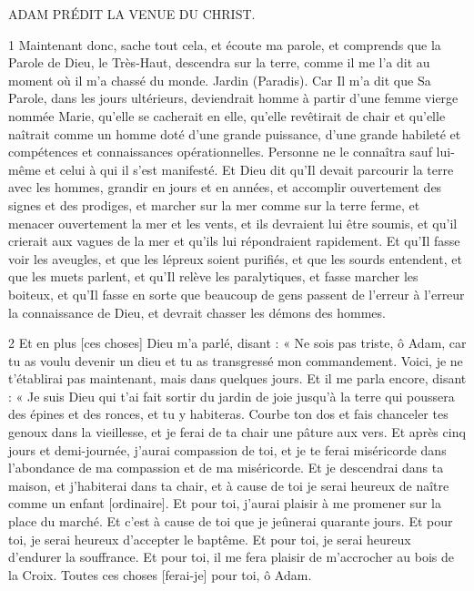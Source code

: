 \par ADAM PRÉDIT LA VENUE DU CHRIST.

\par 1 Maintenant donc, sache tout cela, et écoute ma parole, et comprends que la Parole de Dieu, le Très-Haut, descendra sur la terre, comme il me l'a dit au moment où il m'a chassé du monde. Jardin (Paradis). Car Il m'a dit que Sa Parole, dans les jours ultérieurs, deviendrait homme à partir d'une femme vierge nommée Marie, qu'elle se cacherait en elle, qu'elle revêtirait de chair et qu'elle naîtrait comme un homme doté d'une grande puissance, d'une grande habileté et compétences et connaissances opérationnelles. Personne ne le connaîtra sauf lui-même et celui à qui il s'est manifesté. Et Dieu dit qu'Il devait parcourir la terre avec les hommes, grandir en jours et en années, et accomplir ouvertement des signes et des prodiges, et marcher sur la mer comme sur la terre ferme, et menacer ouvertement la mer et les vents, et ils devraient lui être soumis, et qu'il crierait aux vagues de la mer et qu'ils lui répondraient rapidement. Et qu'Il fasse voir les aveugles, et que les lépreux soient purifiés, et que les sourds entendent, et que les muets parlent, et qu'Il relève les paralytiques, et fasse marcher les boiteux, et qu'Il fasse en sorte que beaucoup de gens passent de l'erreur à l'erreur la connaissance de Dieu, et devrait chasser les démons des hommes.

\par 2 Et en plus [ces choses] Dieu m'a parlé, disant : « Ne sois pas triste, ô Adam, car tu as voulu devenir un dieu et tu as transgressé mon commandement. Voici, je ne t'établirai pas maintenant, mais dans quelques jours. Et il me parla encore, disant : « Je suis Dieu qui t'ai fait sortir du jardin de joie jusqu'à la terre qui poussera des épines et des ronces, et tu y habiteras. Courbe ton dos et fais chanceler tes genoux dans la vieillesse, et je ferai de ta chair une pâture aux vers. Et après cinq jours et demi-journée, j'aurai compassion de toi, et je te ferai miséricorde dans l'abondance de ma compassion et de ma miséricorde. Et je descendrai dans ta maison, et j'habiterai dans ta chair, et à cause de toi je serai heureux de naître comme un enfant [ordinaire]. Et pour toi, j'aurai plaisir à me promener sur la place du marché. Et c'est à cause de toi que je jeûnerai quarante jours. Et pour toi, je serai heureux d'accepter le baptême. Et pour toi, je serai heureux d'endurer la souffrance. Et pour toi, il me fera plaisir de m'accrocher au bois de la Croix. Toutes ces choses [ferai-je] pour toi, ô Adam.

